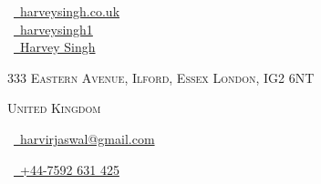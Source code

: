 \documentclass[a4paper,10pt]{extarticle} %
\begin{document}
\pagestyle{empty} %


\begin{multicols}{3}
\normalsize  \faGlobe\ {\href{http://harveysingh.co.uk/}{\  harveysingh.co.uk}}\\
\normalsize \faGithub\ {\href{https://github.com/harveysingh1}{\  harveysingh1}}\\
\normalsize  \faLinkedinSquare\ {\href{https://www.linkedin.com/in/harveysingh1}{\  Harvey Singh}}\\
\columnbreak
\par{\par} %
\par{\centering\normalsize {\textsc{333 Eastern Avenue, Ilford, Essex London, IG2 6NT}}\hfill\par}
\par{\centering\normalsize {\textsc{United Kingdom}}\hfill\par}
\columnbreak
\raggedright\hfill\normalsize \faEnvelope\ {\href{mailto:harvirjaswal@gmail.com}{\  harvirjaswal@gmail.com}}\\
\raggedright\hfill\normalsize \faPhone\ {\href{tel:07592631425}{\  +44-7592 631 425}}\\
\end{multicols}

\end{document}
